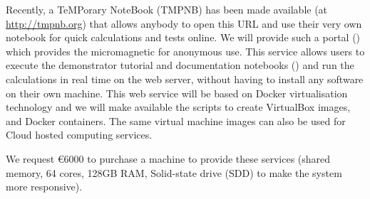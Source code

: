 \begin{workpackage}
\begin{tasklist}
\begin{task}[lead=USO,id=oommf-nb-ve,title=Online portal for
  micromagnetic VRE demonstrator,PM=3,partners={SR,JU},wphases=21-24]
  Recently, a TeMPorary \Jupyter NoteBook (TMPNB) has been made
  available (at \href{http://tmpnb.org}{http://tmpnb.org}) that allows
  anybody to open this URL and use their very own \Jupyter notebook
  for quick calculations and tests online. We will provide such a
  portal () which provides the
  micromagnetic \VRE for anonymous use. This service allows users to
  execute the demonstrator tutorial and documentation notebooks
  () and run the
  calculations in real time on the web server, without having to
  install any software on their own machine.  This web service will be
  based on Docker \cite{Docker} virtualisation technology and we will
  make available the scripts to create VirtualBox \cite{Virtualbox}
  images, and Docker containers. The same virtual machine images can
  also be used for Cloud hosted computing services.

  We request \euro{6000} to purchase a machine to provide these
  services (shared memory, 64 cores, 128GB RAM, Solid-state drive (SDD)
  to make the system more responsive).
\end{task}




\end{tasklist}
\end{workpackage}
